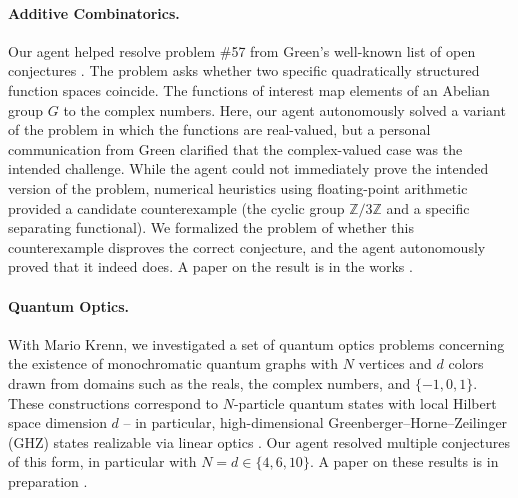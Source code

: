 \paragraph{Additive Combinatorics.} Our agent helped resolve problem \#57 from Green's well-known list of open conjectures \cite{green2024100}. The problem asks whether two specific quadratically structured function spaces coincide. The functions of interest map elements of an Abelian group $G$ to the complex numbers. Here, our agent autonomously solved a variant of the problem in which the functions are real-valued, but a personal communication from Green clarified that the complex-valued case was the intended challenge. While the agent could not immediately prove the intended version of the problem, numerical heuristics using floating-point arithmetic provided a candidate counterexample (the cyclic group $\mathbb{Z}/3\mathbb{Z}$ and a specific separating functional). We formalized the problem of whether this counterexample disproves the correct conjecture, and the agent autonomously proved that it indeed does. A paper on the result is in the works \cite{firsching2026strict}. 

\paragraph{Quantum Optics.} With Mario Krenn, we investigated a set of quantum optics problems concerning the existence of monochromatic quantum graphs with $N$ vertices and $d$ colors drawn from domains such as the reals, the complex numbers, and $\{-1, 0, 1\}$. These constructions correspond to $N$-particle quantum states with local Hilbert space dimension $d$ -- in particular, high-dimensional Greenberger–Horne–Zeilinger (GHZ) states realizable via linear optics \cite{Krenn_2017}. Our agent resolved multiple conjectures of this form, in particular with $N = d \in \{4,6,10\}$. A paper on these results is in preparation \cite{Krenn2026TensorAlgebraic}.   


